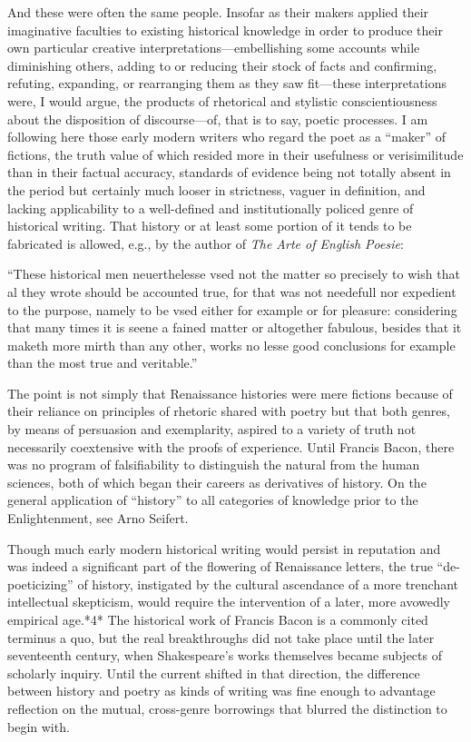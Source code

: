 And these were often the same people. Insofar as their makers applied their imaginative faculties to existing historical knowledge in order to produce their own particular creative interpretations---embellishing some accounts while diminishing others, adding to or reducing their stock of facts and confirming, refuting, expanding, or rearranging them as they saw fit---these interpretations were, I would argue, the products of rhetorical and stylistic conscientiousness about the disposition of discourse---of, that is to say, poetic processes. I am following here those early modern writers who regard the poet as a ``maker'' of fictions, the truth value of which resided more in their usefulness or verisimilitude than in their factual accuracy, standards of evidence being not totally absent in the period but certainly much looser in strictness, vaguer in definition, and lacking applicability to a well-defined and institutionally policed genre of historical writing. That history or at least some portion of it tends to be fabricated is allowed, e.g., by the author of \emph{The Arte of English Poesie}:
\begin{bq}
``These historical men neuerthelesse vsed not the matter so precisely to wish that al they wrote should be accounted true, for that was not needefull nor expedient to the purpose, namely to be vsed either for example or for pleasure: considering that many times it is seene a fained matter or altogether fabulous, besides that it maketh more mirth than any other, works no lesse good conclusions for example than the most true and veritable.''~\cite[55]{puttenham_arte_1970}
\end{bq}
The point is not simply that Renaissance histories were mere fictions because of their reliance on principles of rhetoric shared with poetry but that both genres, by means of persuasion and exemplarity, aspired to a variety of truth not necessarily coextensive with the proofs of experience. Until Francis Bacon, there was no program of falsifiability to distinguish the natural from the human sciences, both of which began their careers as derivatives of history. On the general application of ``history'' to all categories of knowledge prior to the Enlightenment, see Arno Seifert.\nocite{seifert_cognitio_1976}

 Though much early modern historical writing would persist in reputation and was indeed a significant part of the flowering of Renaissance letters, the true ``de-poeticizing'' of history, instigated by the cultural ascendance of a more trenchant intellectual skepticism, would require the intervention of a later, more avowedly empirical age.*4* The historical work of Francis Bacon is a commonly cited terminus a quo, but the real breakthroughs did not take place until the later seventeenth century, when Shakespeare's works themselves became subjects of scholarly inquiry. Until the current shifted in that direction, the difference between history and poetry as kinds of writing was fine enough to advantage reflection on the mutual, cross-genre borrowings that blurred the distinction to begin with.

